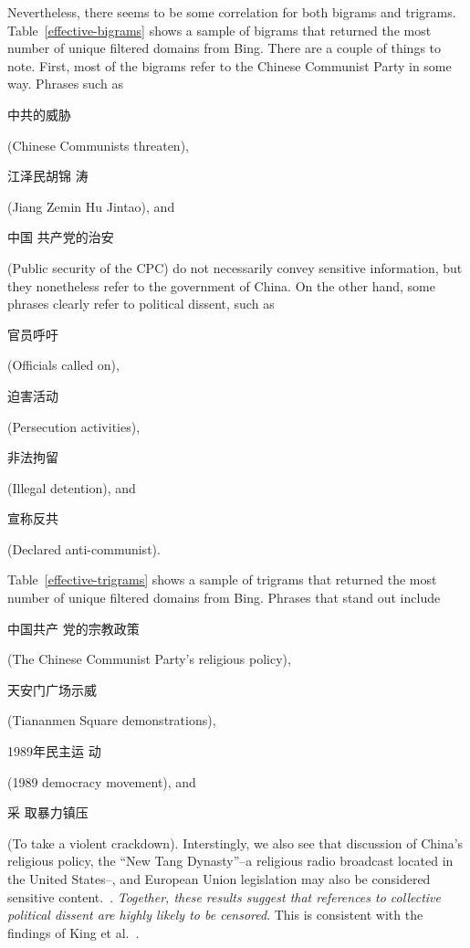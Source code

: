 Nevertheless, there seems to be some correlation for both bigrams and
trigrams. Table~\ref{effective-bigrams} shows a sample of bigrams
that returned the most number of unique filtered domains from
Bing. There are a couple of things to note. First, most of the bigrams
refer to the Chinese Communist Party in some
way. Phrases such as \begin{CJK*}{UTF8}{gbsn}中共的威胁\end{CJK*}
(Chinese Communists threaten), \begin{CJK*}{UTF8}{gbsn}江泽民胡锦
涛\end{CJK*} (Jiang Zemin Hu Jintao), and \begin{CJK*}{UTF8}{gbsn}中国
共产党的治安\end{CJK*} (Public security of the CPC) do not necessarily
convey sensitive information, but they nonetheless refer to the
government of China. On the other hand, some phrases clearly refer to
political dissent, such as \begin{CJK*}{UTF8}{gbsn}官员呼吁\end{CJK*}
(Officials called on), \begin{CJK*}{UTF8}{gbsn}迫害活动\end{CJK*}
(Persecution activities), \begin{CJK*}{UTF8}{gbsn}非法拘留\end{CJK*}
(Illegal detention), and \begin{CJK*}{UTF8}{gbsn}宣称反共\end{CJK*}
(Declared anti-communist).

Table~\ref{effective-trigrams} shows a sample of trigrams
that returned the most number of unique filtered domains from
Bing. Phrases that stand out include \begin{CJK*}{UTF8}{gbsn}中国共产
党的宗教政策\end{CJK*} (The Chinese Communist Party's religious
policy), \begin{CJK*}{UTF8}{gbsn}天安门广场示威\end{CJK*} (Tiananmen
Square demonstrations), \begin{CJK*}{UTF8}{gbsn}1989年民主运
动\end{CJK*} (1989 democracy movement), and \begin{CJK*}{UTF8}{gbsn}采
取暴力镇压\end{CJK*} (To take a violent crackdown). Interstingly, we
also see that discussion of China's religious
policy, the ``New Tang Dynasty''--a religious radio broadcast located in
the United States--, and European Union legislation may also be
considered sensitive content.~\cite{china-religion}. \textit{Together,
these results suggest that references to collective political
dissent are highly likely to be censored}. This
is consistent with the findings of King et al.~\cite{king2013censorship}.